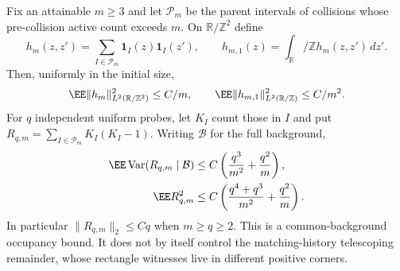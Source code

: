 \documentclass[11pt,letterpaper]{article}
\newcommand{\T}{\mathbb R/\mathbb Z}\newcommand{\Leb}{\operatorname{Leb}}
\newcommand{\ind}{\mathbf 1}\newcommand{\Exp}{\operatorname{Exp}}
\begin{document}
\begin{proposition}
\label{prop:common-parent-probe-L2}
Fix an attainable $m\ge3$ and let $\mathcal P_m$ be the parent
intervals of collisions whose pre-collision active count exceeds
$m$. On $\T^2$ define
\[
 h_m(z,z')=\sum_{I\in\mathcal P_m}\ind_I(z)\ind_I(z'),
 \qquad h_{m,1}(z)=\int_\T h_m(z,z')\,dz'.
\]
Then, uniformly in the initial size,
\begin{equation}\label{eq:common-parent-kernel-L2}
 \EE\|h_m\|_{L^2(\T^2)}^2\le C/m,
 \qquad \EE\|h_{m,1}\|_{L^2(\T)}^2\le C/m^2.
\end{equation}
For $q$ independent uniform probes, let $K_I$ count those in
$I$ and put $R_{q,m}=\sum_{I\in\mathcal P_m}K_I(K_I-1)$.
Writing $\mathcal B$ for the full background,
\begin{align}
 \EE\operatorname{Var}(R_{q,m}\mid\mathcal B)
            &\le C\left(\frac{q^3}{m^2}+\frac{q^2}{m}\right),
                 \label{eq:parent-probe-conditional-variance}\\
 \EE R_{q,m}^2
            &\le C\left(\frac{q^4+q^3}{m^2}
                                      +\frac{q^2}{m}\right).
                 \label{eq:parent-probe-second-moment}
\end{align}
In particular $\|R_{q,m}\|_2\le Cq$ when $m\ge q\ge2$.
This is a common-background occupancy bound. It does not by
itself control the matching-history telescoping remainder,
whose rectangle witnesses live in different positive corners.
\end{proposition}
\end{document}
